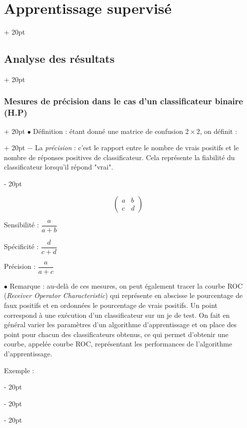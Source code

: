 \documentclass[a4paper, 12pt, twoside]{article}
\newcommand{\ind}[1][20pt]{\advance\leftskip + #1}
\newcommand{\deind}[1][20pt]{\advance\leftskip - #1}
\newenvironment{indt}[2][20pt]{#2 \par \ind[#1]}{\par \deind} %
\begin{document}
\begin{indt}{\section{Apprentissage supervisé}}
\begin{indt}{\subsection{Analyse des résultats}}
\begin{indt}{\subsubsection{Mesures de précision dans le cas d'un classificateur binaire (H.P)}}
\begin{indt}{$\bullet$ Définition : étant donné une matrice de confusion $2 \times 2$, on définit :}
                    $-$ La \emph{précision} : c'est le rapport entre le nombre de vrais positifs et le nombre de réponses positives de classificateur.
                    Cela représente la fiabilité du classificateur lorsqu'il répond "vrai".
                \end{indt}

                \[
                    \begin{pmatrix}
                        a & b
                        \\
                        c & d
                    \end{pmatrix}
                \]

                Sensibilité : $\dfrac{a}{a + b}$

                Spécificité : $\dfrac{d}{c + d}$

                Précision : $\dfrac{a}{a + c}$

                \vspace{12pt}
                
                $\bullet$ Remarque : au-delà de ces mesures, on peut également tracer la courbe ROC (\textit{Receiver Operator Characteristic}) qui représente en abscisse le pourcentage de faux positifs et en ordonnées le pourcentage de vrais positifs. Un point correspond à une exécution d'un classificateur sur un je de test. On fait en général varier les paramètres d'un algorithme d'apprentissage et on place des point pour chacun des classificateurs obtenus, ce qui permet d'obtenir une courbe, appelée courbe ROC, représentant les performances de l'algorithme d'apprentissage.

                \vspace{12pt}
                
                Exemple :

                \begin{center}
\end{center}
\end{indt}
\end{indt}
\end{indt}
\end{document}
